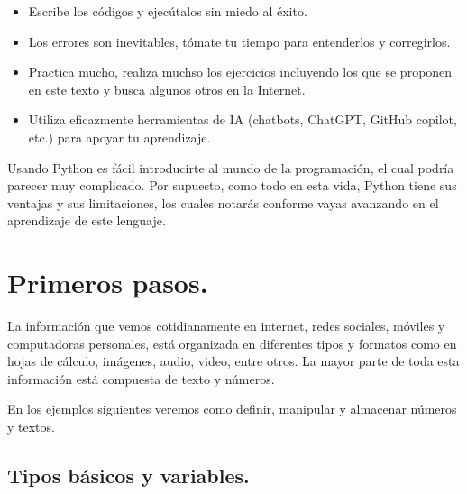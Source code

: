 \documentclass[
  spanish,
  letterpaper,
]{scrbook}
\providecommand{\tightlist}{%
  \setlength{\itemsep}{0pt}\setlength{\parskip}{0pt}}
\theoremstyle{definition}
\theoremstyle{remark}
\begin{document}
\begin{tcolorbox}[enhanced jigsaw, colframe=quarto-callout-tip-color-frame, opacityback=0, toprule=.15mm, colback=white, coltitle=black, leftrule=.75mm, arc=.35mm, breakable, left=2mm, bottomtitle=1mm, rightrule=.15mm, bottomrule=.15mm, colbacktitle=quarto-callout-tip-color!10!white, toptitle=1mm, titlerule=0mm, opacitybacktitle=0.6, title=\textcolor{quarto-callout-tip-color}{\faLightbulb}\hspace{0.5em}{Recomendaciones para aprender un nuevo lenguaje.}]

\begin{itemize}
\tightlist
\item
  Escribe los códigos y ejecútalos sin miedo al éxito.
\item
  Los errores son inevitables, tómate tu tiempo para entenderlos y
  corregirlos.
\item
  Practica mucho, realiza muchso los ejercicios incluyendo los que se
  proponen en este texto y busca algunos otros en la Internet.
\item
  Utiliza eficazmente herramientas de IA (chatbots, ChatGPT, GitHub
  copilot, etc.) para apoyar tu aprendizaje.
\end{itemize}

\end{tcolorbox}

Usando Python es fácil introducirte al mundo de la programación, el cual
podría parecer muy complicado. Por supuesto, como todo en esta vida,
Python tiene sus ventajas y sus limitaciones, los cuales notarás
conforme vayas avanzando en el aprendizaje de este lenguaje.

\chapter{Primeros pasos.}\label{primeros-pasos.}

La información que vemos cotidianamente en internet, redes sociales,
móviles y computadoras personales, está organizada en diferentes tipos y
formatos como en hojas de cálculo, imágenes, audio, video, entre otros.
La mayor parte de toda esta información está compuesta de texto y
números.

En los ejemplos siguientes veremos como definir, manipular y almacenar
números y textos.

\section{Tipos básicos y
variables.}\label{sec-l1-tipos-basicos-variables}
\end{document}
